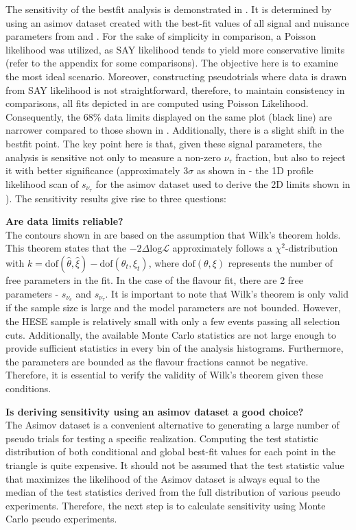 The sensitivity of the bestfit analysis is demonstrated in . It is determined by using an asimov dataset  created with the best-fit values of all signal and nuisance parameters from  and . For the sake of simplicity in comparison, a Poisson likelihood was utilized, as SAY likelihood tends to yield more conservative limits (refer to the appendix for some comparisons). The objective here is to examine the most ideal scenario. Moreover, constructing pseudotrials where data is drawn from SAY likelihood is not straightforward, therefore, to maintain consistency in comparisons, all fits depicted in  are computed using Poisson Likelihood. Consequently, the 68\% data limits displayed on the same plot (black line) are narrower compared to those shown in . Additionally, there is a slight shift in the bestfit point. The key point here is that, given these signal parameters, the analysis is sensitive not only to measure a non-zero $\nu_{\tau}$ fraction, but also to reject it with better significance (approximately $3\sigma$ as shown in  - the 1D profile likelihood scan of $s_{\nu_{\tau}}$ for the asimov dataset used to derive the 2D limits shown in ). The sensitivity results give rise to three questions:

\textbf{Are data limits reliable?}\\
The contours shown in  are based on the assumption that Wilk's theorem holds. This theorem states that the $-2\Delta\mathrm{log}\mathcal{L}$ approximately follows a $\chi^2$-distribution with $k = \text{dof}(\hat{\theta}, \hat{\xi}) - \text{dof}(\theta_t, \xi_t)$, where $\text{dof}(\theta, \xi)$ represents the number of free parameters in the fit. In the case of the flavour fit, there are 2 free parameters - $s_{\nu_{e}}$ and $s_{\nu_{\tau}}$. It is important to note that Wilk's theorem is only valid if the sample size is large and the model parameters are not bounded. However, the HESE sample is relatively small with only a few events passing all selection cuts. Additionally, the available Monte Carlo statistics are not large enough to provide sufficient statistics in every bin of the analysis histograms. Furthermore, the parameters are bounded as the flavour fractions cannot be negative. Therefore, it is essential to verify the validity of Wilk's theorem given these conditions.
     
\textbf{Is deriving sensitivity using an asimov dataset a good choice?}\\
The Asimov dataset is a convenient alternative to generating a large number of pseudo trials for testing a specific realization. Computing the test statistic distribution of both conditional and global best-fit values for each point in the triangle is quite expensive. It should not be assumed that the test statistic value that maximizes the likelihood of the Asimov dataset is always equal to the median of the test statistics derived from the full distribution of various pseudo experiments. Therefore, the next step is to calculate sensitivity using Monte Carlo pseudo experiments.

